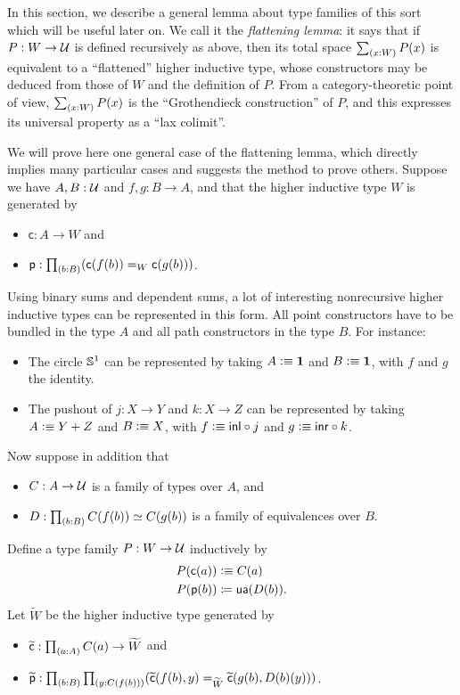 In this section, we describe a general lemma about type families of this sort which will be useful later on.
We call it the \emph{flattening lemma}: it says that if $P:W\to\mathcal{U}$ is defined recursively as above, then its total space $\sm{x:W} P(x)$ is equivalent to a ``flattened'' higher inductive type, whose constructors may be deduced from those of $W$ and the definition of $P$.
From a category-theoretic point of view, $\sm{x:W} P(x)$ is the ``Grothendieck construction'' of $P$, and this expresses its universal property as a ``lax colimit''.

\newcommand{\cc}{\mathsf{c}}
\newcommand{\pp}{\mathsf{p}}
\newcommand{\cct}{\widetilde{\mathsf{c}}}
\newcommand{\ppt}{\widetilde{\mathsf{p}}}

We will prove here one general case of the flattening lemma, which directly implies many particular cases and suggests the method to prove others.
Suppose we have $A,B:\mathcal{U}$ and $f,g:B\to{}A$, and that the higher inductive type $W$ is generated by
\begin{itemize}
\item $\cc:A\to{}W$ and
\item $\pp:\prd{b:B} (\cc(f(b))=_W\cc(g(b)))$.
\end{itemize}

Using binary sums and dependent sums, a lot of interesting nonrecursive higher
inductive types can be represented in this form. All point constructors have to
be bundled in the type $A$ and all path constructors in the type $B$.
For instance:
\begin{itemize}
\item The circle $\mathbb{S}^1$ can be represented by taking $A\vcentcolon\equiv \mathbf{1}$ and $B\vcentcolon\equiv \mathbf{1}$, with $f$ and $g$ the identity.
\item The pushout of $j:X\to Y$ and $k:X\to Z$ can be represented by taking $A\vcentcolon\equiv Y+Z$ and $B\vcentcolon\equiv X$, with $f\vcentcolon\equiv \mathsf{inl} \circ j$ and $g\vcentcolon\equiv \mathsf{inr}\circ k$.
\end{itemize}
Now suppose in addition that
\begin{itemize}
\item $C:A\to\mathcal{U}$ is a family of types over $A$, and
\item $D:\prd{b:B}C(f(b))\simeq{}C(g(b))$ is a family of equivalences over $B$.
\end{itemize}
Define a type family $P : W\to\mathcal{U}$ inductively by
\begin{align*}
  P(\cc(a)) &\defeq C(a)\\
  \map{P}{\pp(b)} &\defid \ua(D(b)).
\end{align*}
\newcommand{\Wtil}{\ensuremath{\widetilde{W}}\xspace}
Let \Wtil be the higher inductive type generated by
\begin{itemize}
\item $\cct:\prd{a:A} C(a) \to \Wtil$ and
\item $\ppt:\prd{b:B}{y:C(f(b))} (\cct(f(b),y)=_{\Wtil}\cct(g(b),D(b)(y)))$.
\end{itemize}

